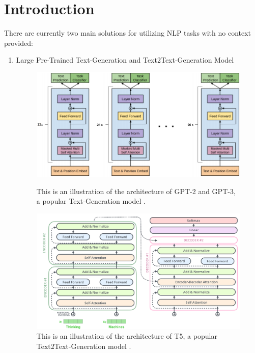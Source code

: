 \section{Introduction}

There are currently two main solutions for utilizing NLP tasks with no context provided: 

\begin{enumerate}[leftmargin=1em]
    \item Large Pre-Trained Text-Generation and Text2Text-Generation Model \label{CurrSolOne}
        \begin{itemize}[leftmargin=1em]
            \begin{figure}
                \includegraphics[width=1.0\columnwidth]{gpt3architecture.png}
                \caption{This is an illustration of the architecture of GPT-2 and GPT-3, a popular Text-Generation model \cite{gpt3-overview, the-gpt-3-architecture-on-a-napkin}.}
                \label{fig:CurrSolOneImg}
                \includegraphics[width=1.0\columnwidth]{t5architecture.png}
                \caption{This is an illustration of the architecture of T5, a popular Text2Text-Generation model \cite{alammar}.}

\end{figure}
\end{itemize}
\end{enumerate}

